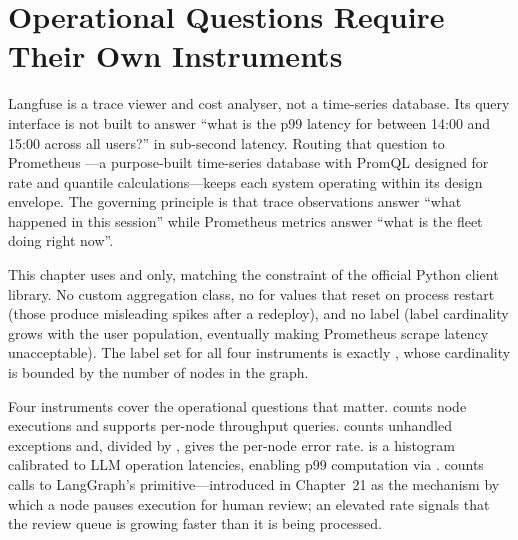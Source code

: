 \section{Operational Questions Require Their Own Instruments}
\label{sec:obs-prometheus}

Langfuse is a trace viewer and cost analyser, not a time-series
database. Its query interface is not built to answer ``what is the
p99 latency for  between 14:00 and 15:00 across
all users?'' in sub-second latency. Routing that question to Prometheus
---a purpose-built time-series database with PromQL designed for rate
and quantile calculations---keeps each system operating within its
design envelope. The governing principle is that trace observations
answer ``what happened in this session'' while Prometheus metrics answer
``what is the fleet doing right now''.

This chapter uses  and
 only, matching the constraint of
the official Python client library. No custom aggregation class, no
 for values that reset on process restart (those produce
misleading spikes after a redeploy), and no  label
(label cardinality grows with the user population, eventually making
Prometheus scrape latency unacceptable). The label set for all four
instruments is exactly , whose cardinality is bounded
by the number of nodes in the graph.

Four instruments cover the operational questions that matter.
 counts node executions and supports
per-node throughput queries.  counts
unhandled exceptions and, divided by , gives
the per-node error rate.  is a
histogram calibrated to LLM operation latencies, enabling p99
computation via . 
counts calls to LangGraph's  primitive---introduced
in Chapter~21 as the mechanism by which a node pauses execution for
human review; an elevated rate signals that the review queue is growing
faster than it is being processed.

